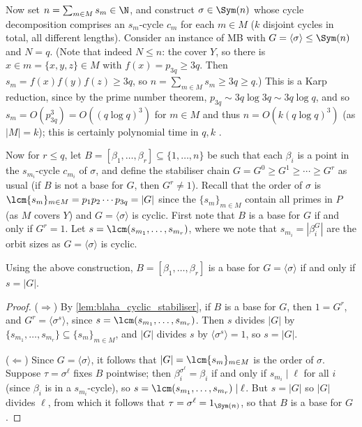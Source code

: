 Now set $n = \sum_{m \in M} s_m \in \N$, and construct $\sigma \in \Sym(n)$ whose cycle decomposition comprises an $s_m$-cycle $c_m$ for each $m \in M$ ($k$ disjoint cycles in total, all different lengths). Consider an instance of MB with $G = \langle \sigma \rangle \leq \Sym(n)$ and $N = q$. (Note that indeed $N \leq n$: the  cover $Y$, so there is $x \in m = \{x,y,z\} \in M$ with $f(x) = p_{3q} \geq 3q$. Then $s_m = f(x)f(y)f(z) \geq 3q$, so $n = \sum_{m \in M} s_m \geq 3q \geq q$.) This is a Karp reduction, since by the prime number theorem, $p_{3q} \sim 3q\log 3q \sim 3q\log q$, and so $s_m = O(p_{3q}^3) = O((q\log q)^3)$ for $m \in M$ and thus $n = O(k(q\log q)^3)$ (as $|M| = k$); this is certainly polynomial time in $q,k$ .

Now for $r \leq q$, let $B = [\beta_1,\dotsc,\beta_r] \subseteq \{1,\dotsc,n\}$ be such that each $\beta_i$ is a point in the $s_{m_i}$-cycle $c_{m_i}$ of $\sigma$, and define the stabiliser chain $G = G^0 \geq G^1 \geq \dotsb \geq G^r$ as usual (if $B$ is not a base for $G$, then $G^r \neq 1$). Recall that the order of $\sigma$ is $\lcm\{s_m\}_{m \in M} = p_1 p_2 \dotsb p_{3q} = |G|$ since the $\{s_m\}_{m \in M}$ contain all primes in $P$ (as $M$ covers $Y$) and $G = \langle \sigma \rangle$ is cyclic. First note that $B$ is a base for $G$ if and only if $G^r = 1$. Let $s = \lcm(s_{m_1},\dotsc,s_{m_r})$, where we note that $s_{m_i} = |\beta_i^G|$ are the orbit sizes as $G = \langle \sigma \rangle$ is cyclic. 

\begin{lemma}\label{lem:blaha_cyclic_base}
    Using the above construction, $B = [\beta_1,\dotsc,\beta_r]$ is a base for $G = \langle \sigma \rangle$ if and only if $s = |G|$.
\end{lemma}

\begin{proof}
    ($\Longrightarrow$) By \autoref{lem:blaha_cyclic_stabiliser}, if $B$ is a base for $G$, then $1 = G^r$, and $G^r = \langle \sigma^s\rangle$, since $s = \lcm(s_{m_1},\dotsc,s_{m_r})$. Then $s$ divides $|G|$ by $\{s_{m_1},\dotsc,s_{m_r}\} \subseteq \{s_m\}_{m \in M}$, and $|G|$ divides $s$ by $\langle \sigma^s \rangle = 1$, so $s = |G|$.

    ($\Longleftarrow$) Since $G = \langle \sigma \rangle$, it follows that $|G| = \lcm\{s_m\}_{m \in M}$ is the order of $\sigma$. Suppose $\tau = \sigma^\ell$ fixes $B$ pointwise; then $\beta_i^{\sigma^\ell} = \beta_i$ if and only if $s_{m_i} \mid \ell$ for all $i$ (since $\beta_i$ is in a $s_{m_i}$-cycle), so $s = \lcm(s_{m_1},\dotsc,s_{m_r}) \mid \ell$. But $s = |G|$ so $|G|$ divides $\ell$, from which it follows that $\tau = \sigma^\ell = 1_{\Sym(n)}$, so that $B$ is a base for $G$.
\end{proof}

